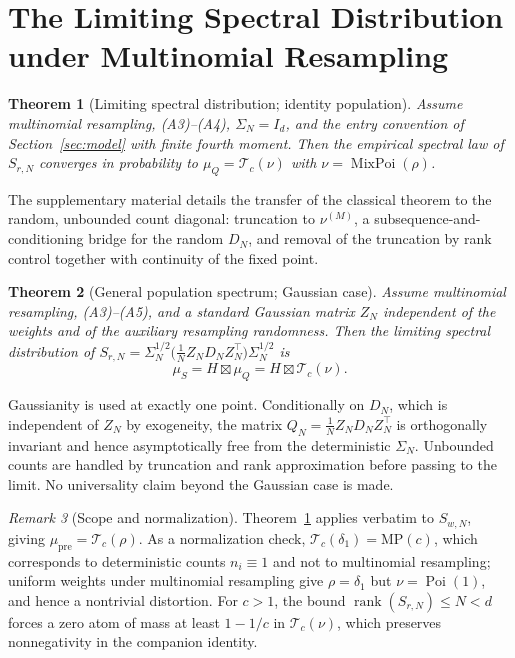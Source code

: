 \documentclass[lettersize,journal]{IEEEtran}
\newtheorem{theo}{Theorem}
\theoremstyle{remark}
\newtheorem{rem}[theo]{Remark}
\begin{document}
\section{The Limiting Spectral Distribution under Multinomial Resampling}
\label{sec:lsd}

\begin{theo}[Limiting spectral distribution; identity population]
\label{thm:lsd-id}
Assume multinomial resampling, (A3)--(A4), $\Sigma_N=I_d$, and the entry
convention of Section~\ref{sec:model} with finite fourth moment. Then the
empirical spectral law of $S_{r,N}$ converges in probability to
$\mu_Q=\mathcal{T}_c(\nu)$ with $\nu=\operatorname{MixPoi}(\rho)$.
\end{theo}

The supplementary material details the transfer of the classical theorem to
the random, unbounded count diagonal: truncation to $\nu^{(M)}$, a
subsequence-and-conditioning bridge for the random $D_N$, and removal of the
truncation by rank control together with continuity of the fixed point.

\begin{theo}[General population spectrum; Gaussian case]
\label{thm:lsd-gen}
Assume multinomial resampling, (A3)--(A5), and a standard Gaussian matrix
$Z_N$ independent of the weights and of the auxiliary resampling randomness.
Then the limiting spectral distribution of
$S_{r,N}=\Sigma_N^{1/2}\big(\frac1NZ_ND_NZ_N^\top\big)\Sigma_N^{1/2}$ is
\begin{equation}
  \mu_S = H\boxtimes\mu_Q = H\boxtimes\mathcal{T}_c(\nu).
  \label{eq:lsd-gen}
\end{equation}
\end{theo}

Gaussianity is used at exactly one point. Conditionally on $D_N$, which is
independent of $Z_N$ by exogeneity, the matrix
$Q_N=\frac1NZ_ND_NZ_N^\top$ is orthogonally invariant and hence
asymptotically free from the deterministic $\Sigma_N$. Unbounded counts are
handled by truncation and rank approximation before passing to the limit. No
universality claim beyond the Gaussian case is made.

\begin{rem}[Scope and normalization]
\label{rem:normalization}
Theorem~\ref{thm:lsd-id} applies verbatim to $S_{w,N}$, giving
$\mu_{\mathrm{pre}}=\mathcal{T}_c(\rho)$. As a normalization check,
$\mathcal{T}_c(\delta_1)=\mathrm{MP}(c)$, which corresponds to deterministic
counts $n_i\equiv1$ and not to multinomial resampling; uniform weights under
multinomial resampling give $\rho=\delta_1$ but $\nu=\operatorname{Poi}(1)$,
and hence a nontrivial distortion. For $c>1$, the bound
$\operatorname{rank}(S_{r,N})\le N<d$ forces a zero atom of mass at least
$1-1/c$ in $\mathcal{T}_c(\nu)$, which preserves nonnegativity in the
companion identity.
\end{rem}
\end{document}
